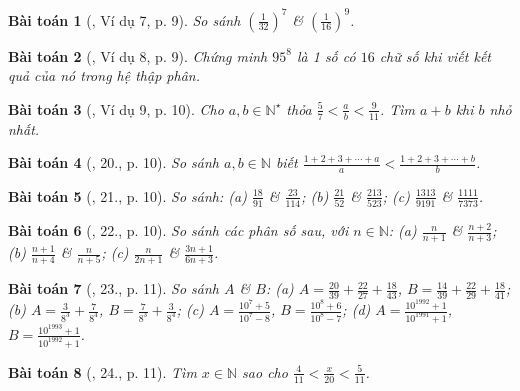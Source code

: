 \documentclass{article}
\newtheorem{baitoan}{Bài toán}
\begin{document}
\begin{baitoan}[\cite{Binh_Toan_6_tap_2}, Ví dụ 7, p. 9]
	So sánh $\left(\frac{1}{32}\right)^7$ \& $\left(\frac{1}{16}\right)^9$.
\end{baitoan}

\begin{baitoan}[\cite{Binh_Toan_6_tap_2}, Ví dụ 8, p. 9]
	Chứng minh $95^8$ là 1 số có $16$ chữ số khi viết kết quả của nó trong hệ thập phân.
\end{baitoan}

\begin{baitoan}[\cite{Binh_Toan_6_tap_2}, Ví dụ 9, p. 10]
	Cho $a,b\in\mathbb{N}^\star$ thỏa $\frac{5}{7} < \frac{a}{b} < \frac{9}{11}$. Tìm $a + b$ khi $b$ nhỏ nhất.
\end{baitoan}

\begin{baitoan}[\cite{Binh_Toan_6_tap_2}, 20., p. 10]
	So sánh $a,b\in\mathbb{N}$ biết $\frac{1 + 2 + 3 + \cdots + a}{a} < \frac{1 + 2 + 3 + \cdots + b}{b}$.
\end{baitoan}

\begin{baitoan}[\cite{Binh_Toan_6_tap_2}, 21., p. 10]
	So sánh: (a) $\frac{18}{91}$ \& $\frac{23}{114}$; (b) $\frac{21}{52}$ \& $\frac{213}{523}$; (c) $\frac{1313}{9191}$ \& $\frac{1111}{7373}$.
\end{baitoan}

\begin{baitoan}[\cite{Binh_Toan_6_tap_2}, 22., p. 10]
	So sánh các phân số sau, với $n\in\mathbb{N}$: (a) $\frac{n}{n + 1}$ \& $\frac{n + 2}{n + 3}$; (b) $\frac{n + 1}{n + 4}$ \& $\frac{n}{n + 5}$; (c) $\frac{n}{2n + 1}$ \& $\frac{3n + 1}{6n + 3}$.
\end{baitoan}

\begin{baitoan}[\cite{Binh_Toan_6_tap_2}, 23., p. 11]
	So sánh $A$ \& $B$: (a) $A = \frac{20}{39} + \frac{22}{27} + \frac{18}{43}$, $B = \frac{14}{39} + \frac{22}{29} + \frac{18}{41}$; (b) $A = \frac{3}{8^3} + \frac{7}{8^4}$, $B = \frac{7}{8^3} + \frac{3}{8^4}$; (c) $A = \frac{10^7 + 5}{10^7 - 8}$, $B = \frac{10^8 + 6}{10^8 - 7}$; (d) $A = \frac{10^{1992} + 1}{10^{1991} + 1}$, $B = \frac{10^{1993} + 1}{10^{1992} + 1}$.
\end{baitoan}

\begin{baitoan}[\cite{Binh_Toan_6_tap_2}, 24., p. 11]
	Tìm $x\in\mathbb{N}$ sao cho $\frac{4}{11} < \frac{x}{20} < \frac{5}{11}$.
\end{baitoan}
\end{document}
